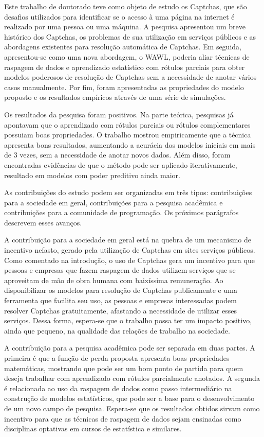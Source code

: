\documentclass[12pt,twoside,brazilian]{book}
\begin{document}
Este trabalho de doutorado teve como objeto de estudo os Captchas, que
são desafios utilizados para identificar se o acesso à uma página na
internet é realizado por uma pessoa ou uma máquina. A pesquisa
apresentou um breve histórico dos Captchas, os problemas de sua
utilização em serviços públicos e as abordagens existentes para
resolução automática de Captchas. Em seguida, apresentou-se como uma
nova abordagem, o WAWL, poderia aliar técnicas de raspagem de dados e
aprendizado estatístico com rótulos parciais para obter modelos
poderosos de resolução de Captchas sem a necessidade de anotar vários
casos manualmente. Por fim, foram apresentadas as propriedades do modelo
proposto e os resultados empíricos através de uma série de simulações.

Os resultados da pesquisa foram positivos. Na parte teórica, pesquisas
já apontavam que o aprendizado com rótulos parciais ou rótulos
complementares possuiam boas propriedades. O trabalho mostrou
empiricamente que a técnica apresenta bons resultados, aumentando a
acurácia dos modelos iniciais em mais de 3 vezes, sem a necessidade de
anotar novos dados. Além disso, foram encontradas evidências de que o
método pode ser aplicado iterativamente, resultado em modelos com poder
preditivo ainda maior.

As contribuições do estudo podem ser organizadas em três tipos:
contribuições para a sociedade em geral, contribuições para a pesquisa
acadêmica e contribuições para a comunidade de programação. Os próximos
parágrafos descrevem esses avanços.

A contribuição para a sociedade em geral está na quebra de um mecanismo
de incentivo nefasto, gerado pela utilização de Captchas em sites
serviços públicos. Como comentado na introdução, o uso de Captchas gera
um incentivo para que pessoas e empresas que fazem raspagem de dados
utilizem serviços que se aproveitam de mão de obra humana com baixíssima
remuneração. Ao disponibilizar os modelos para resolução de Captchas
publicamente e uma ferramenta que facilita seu uso, as pessoas e
empresas interessadas podem resolver Captchas gratuitamente, afastando a
necessidade de utilizar esses serviços. Dessa forma, espera-se que o
trabalho possa ter um impacto positivo, ainda que pequeno, na qualidade
das relações de trabalho na sociedade.

A contribuição para a pesquisa acadêmica pode ser separada em duas
partes. A primeira é que a função de perda proposta apresenta boas
propriedades matemáticas, mostrando que pode ser um bom ponto de partida
para quem deseja trabalhar com aprendizado com rótulos parcialmente
anotados. A segunda é relacionada ao uso da raspagem de dados como passo
intermediário na construção de modelos estatísticos, que pode ser a base
para o desenvolvimento de um novo campo de pesquisa. Espera-se que os
resultados obtidos sirvam como incentivo para que as técnicas de
raspagem de dados sejam ensinadas como disciplinas optativas em cursos
de estatística e similares.
\end{document}

